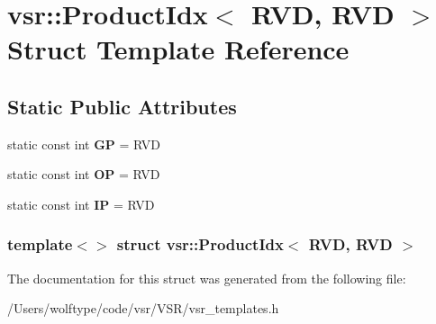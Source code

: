 \hypertarget{structvsr_1_1_product_idx_3_01_r_v_d_00_01_r_v_d_01_4}{\section{vsr\-:\-:Product\-Idx$<$ R\-V\-D, R\-V\-D $>$ Struct Template Reference}
\label{structvsr_1_1_product_idx_3_01_r_v_d_00_01_r_v_d_01_4}
}
\subsection*{Static Public Attributes}
\begin{DoxyCompactItemize}
\item 
\hypertarget{structvsr_1_1_product_idx_3_01_r_v_d_00_01_r_v_d_01_4_a54fb3fe3c28d64047aad00d3d484c4a4}{static const int {\bfseries G\-P} = R\-V\-D}\label{structvsr_1_1_product_idx_3_01_r_v_d_00_01_r_v_d_01_4_a54fb3fe3c28d64047aad00d3d484c4a4}

\item 
\hypertarget{structvsr_1_1_product_idx_3_01_r_v_d_00_01_r_v_d_01_4_a927b8987c0207c54a954a7c68f32d668}{static const int {\bfseries O\-P} = R\-V\-D}\label{structvsr_1_1_product_idx_3_01_r_v_d_00_01_r_v_d_01_4_a927b8987c0207c54a954a7c68f32d668}

\item 
\hypertarget{structvsr_1_1_product_idx_3_01_r_v_d_00_01_r_v_d_01_4_a36f307b541a2db6e316fbf90b61524a1}{static const int {\bfseries I\-P} = R\-V\-D}\label{structvsr_1_1_product_idx_3_01_r_v_d_00_01_r_v_d_01_4_a36f307b541a2db6e316fbf90b61524a1}

\end{DoxyCompactItemize}
\subsubsection*{template$<$$>$ struct vsr\-::\-Product\-Idx$<$ R\-V\-D, R\-V\-D $>$}



The documentation for this struct was generated from the following file\-:\begin{DoxyCompactItemize}
\item 
/\-Users/wolftype/code/vsr/\-V\-S\-R/vsr\-\_\-templates.\-h\end{DoxyCompactItemize}
